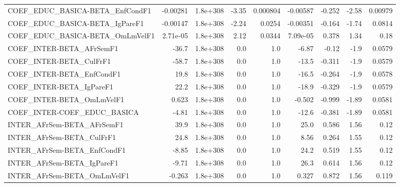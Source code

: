 \begin{tabular}{lrrrrrrrr}
COEF\_EDUC\_BASICA-BETA\_EnfCondF1       &    -0.00281 &     1.8e+308 &   -3.35 & 0.000804 &   -0.00587 &      -0.252 &        -2.58 &       0.00979 \\
COEF\_EDUC\_BASICA-BETA\_IgPareF1        &    -0.00147 &     1.8e+308 &   -2.24 &   0.0254 &   -0.00351 &      -0.164 &        -1.74 &        0.0814 \\
COEF\_EDUC\_BASICA-BETA\_OmLmVelF1       &    2.71e-05 &     1.8e+308 &    2.12 &   0.0344 &   7.09e-05 &       0.378 &         1.34 &          0.18 \\
COEF\_INTER-BETA\_AFrSemF1              &       -36.7 &     1.8e+308 &     0.0 &      1.0 &      -6.87 &       -0.12 &         -1.9 &        0.0579 \\
COEF\_INTER-BETA\_CulFrF1               &       -58.7 &     1.8e+308 &     0.0 &      1.0 &      -13.5 &      -0.311 &         -1.9 &        0.0579 \\
COEF\_INTER-BETA\_EnfCondF1             &        19.8 &     1.8e+308 &     0.0 &      1.0 &      -16.5 &      -0.264 &         -1.9 &        0.0578 \\
COEF\_INTER-BETA\_IgPareF1              &        22.2 &     1.8e+308 &     0.0 &      1.0 &      -18.9 &      -0.329 &         -1.9 &        0.0579 \\
COEF\_INTER-BETA\_OmLmVelF1             &       0.623 &     1.8e+308 &     0.0 &      1.0 &     -0.502 &      -0.999 &        -1.89 &        0.0581 \\
COEF\_INTER-COEF\_EDUC\_BASICA           &       -4.81 &     1.8e+308 &     0.0 &      1.0 &      -12.6 &      -0.381 &        -1.89 &        0.0581 \\
INTER\_AFrSem-BETA\_AFrSemF1            &        39.9 &     1.8e+308 &     0.0 &      1.0 &       25.0 &       0.586 &         1.56 &          0.12 \\
INTER\_AFrSem-BETA\_CulFrF1             &        24.8 &     1.8e+308 &     0.0 &      1.0 &       8.56 &       0.264 &         1.55 &          0.12 \\
INTER\_AFrSem-BETA\_EnfCondF1           &       -8.85 &     1.8e+308 &     0.0 &      1.0 &       24.2 &       0.519 &         1.55 &          0.12 \\
INTER\_AFrSem-BETA\_IgPareF1            &       -9.71 &     1.8e+308 &     0.0 &      1.0 &       26.3 &       0.614 &         1.56 &          0.12 \\
INTER\_AFrSem-BETA\_OmLmVelF1           &      -0.263 &     1.8e+308 &     0.0 &      1.0 &      0.327 &       0.872 &         1.56 &         0.119 \\

\end{tabular}
